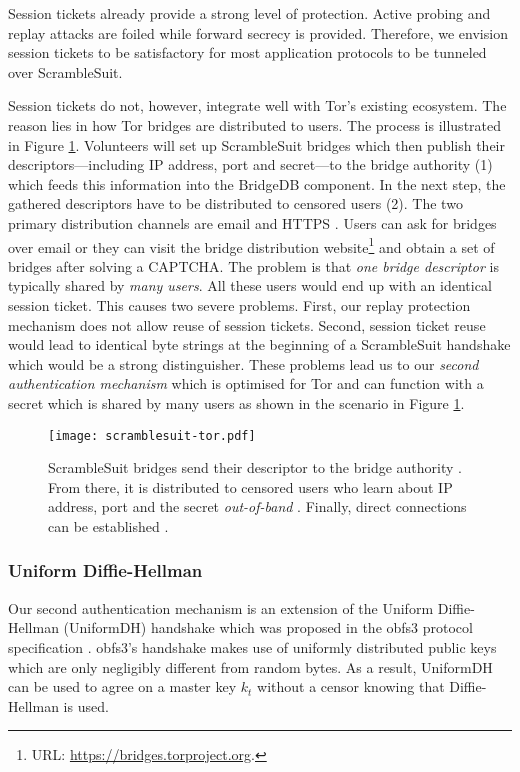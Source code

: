 \documentclass{sig-alternate}
\newcommand{\pt}{\textsf{ScrambleSuit}}
\numberwithin{enumi}{section}
\numberwithin{notesctr}{section}
\begin{document}
Session tickets already provide a strong level of protection. Active probing and replay attacks are
foiled while forward secrecy is provided. Therefore, we envision session tickets to be satisfactory
for most application protocols to be tunneled over \pt{}.

Session tickets do not, however, integrate well with Tor's existing ecosystem. The reason lies in
how Tor bridges are distributed to users. The process is illustrated in Figure
\ref{fig:scramblesuit-tor}. Volunteers will set up \pt{} bridges which then publish their
descriptors---including IP address, port and secret---to the bridge authority (1) which feeds this
information into the BridgeDB component. In the next step, the gathered descriptors have to be
distributed to censored users (2). The two primary distribution channels are email and HTTPS
\cite{Ling2012}.  Users can ask for bridges over email or they can visit the bridge distribution
website\footnote{URL: \url{https://bridges.torproject.org}.} and obtain a set of bridges after
solving a CAPTCHA. The problem is that \emph{one bridge descriptor} is typically shared by
\emph{many users}.  All these users would end up with an identical session ticket. This causes two
severe problems.  First, our replay protection mechanism does not allow reuse of session tickets.
Second, session ticket reuse would lead to identical byte strings at the beginning of a \pt{}
handshake which would be a strong distinguisher. These problems lead us to our \emph{second
authentication mechanism} which is optimised for Tor and can function with a secret which is shared
by many users as shown in the scenario in Figure \ref{fig:scramblesuit-tor}.

\begin{figure}
\centering
\texttt{[image: scramblesuit-tor.pdf]}
\caption{\pt{} bridges send their descriptor to the bridge authority . From there, it is
distributed to censored users who learn about IP address, port and the secret \emph{out-of-band}
. Finally, direct connections can be established .}
\label{fig:scramblesuit-tor}
\end{figure}

\subsubsection{Uniform Diffie-Hellman}
\label{sec:uniformdh}
Our second authentication mechanism is an extension of the Uniform Diffie-Hellman (UniformDH)
handshake which was proposed in the obfs3 protocol specification \cite[\S 3]{obfs3}. obfs3's
handshake makes use of uniformly distributed public keys which are only negligibly different from
random bytes. As a result, UniformDH can be used to agree on a master key $k_{t}$ without a censor
knowing that Diffie-Hellman is used.
\end{document}
